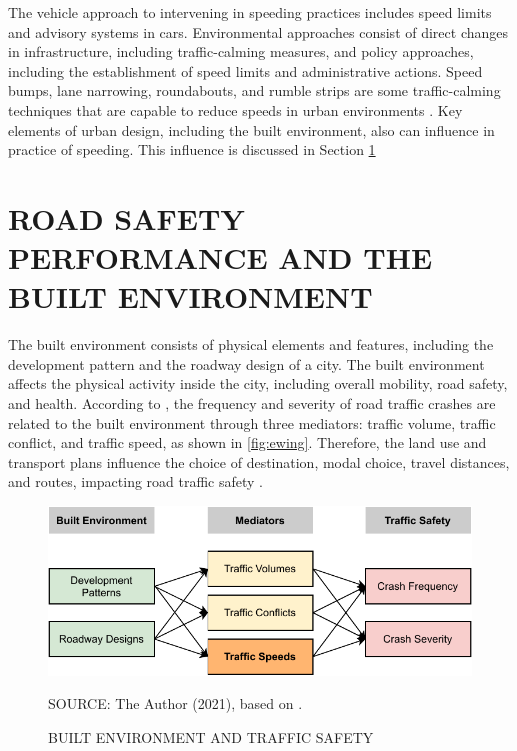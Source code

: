 The vehicle approach to intervening in speeding practices includes speed limits and advisory systems in cars. Environmental approaches consist of direct changes in infrastructure, including traffic-calming measures, and policy approaches, including the establishment of speed limits and administrative actions. Speed bumps, lane narrowing, roundabouts, and rumble strips are some traffic-calming techniques that are capable to reduce speeds in urban environments \cite{Welle2016}. Key elements of urban design, including the built environment, also can influence in practice of speeding. This influence is discussed in Section \ref{be}

\section{ROAD SAFETY PERFORMANCE AND THE BUILT ENVIRONMENT} \label{be}





The built environment consists of physical elements and features, including the development pattern and the roadway design of a city. The built environment affects the physical activity inside the city, including overall mobility, road safety, and health. According to \textcite{Ewing2009}, the frequency and severity of road traffic crashes are related to the built environment through three mediators: traffic volume, traffic conflict, and traffic speed, as shown in \autoref{fig:ewing}. Therefore, the land use and transport plans influence the choice of destination, modal choice, travel distances, and routes, impacting road traffic safety \cite{Tiwari}.  

\begin{figure}[!htbp]
    \centering\footnotesize
    \captionsetup{font=footnotesize}
    \caption{BUILT ENVIRONMENT AND TRAFFIC SAFETY}
    \includegraphics{fig/ewing.pdf}
    \label{fig:ewing}
    \par SOURCE: The Author (2021), based on \textcite{Ewing2009}.
\end{figure}

